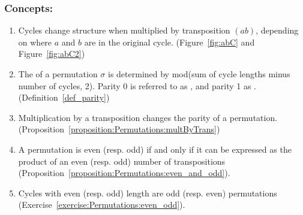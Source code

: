 \subsubsection*{Concepts:}
\begin{enumerate}
\item 
Cycles change structure when  multiplied by transposition $(ab)$, depending on where $a$ and $b$ are in the original cycle. (Figure~\ref{fig:abC} and  Figure~\ref{fig:abC2})
\item
The  of a permutation $\sigma$ is determined by mod(sum of cycle lengths minus number of cycles, 2). Parity 0 is referred to as , and parity 1 as . (Definition~\ref{def_parity})
\item
Multiplication by a transposition changes the parity of a permutation. (Proposition~\ref{proposition:Permutations:multByTrans})
\item
A permutation is even (resp. odd) if and only if it can be expressed as the product of an even (resp. odd) number of transpositions (Proposition~\ref{proposition:Permutations:even_and_odd}).
\item
Cycles with even (resp. odd) length are odd (resp. even) permutations (Exercise~\ref{exercise:Permutations:even_odd}).
\end{enumerate}

